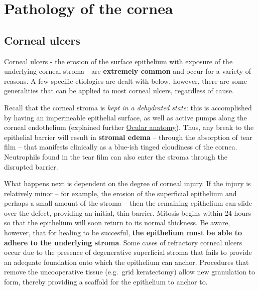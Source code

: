 \documentclass[
  openany]{article}
\begin{document}
\hypertarget{pathology-of-the-cornea}{%
\section{Pathology of the cornea}\label{pathology-of-the-cornea}}

\hypertarget{corneal-ulcers}{%
\subsection{Corneal ulcers}\label{corneal-ulcers}}

Corneal ulcers - the erosion of the surface epithelium with exposure of the underlying corneal stroma - are \textbf{extremely common} and occur for a variety of reasons. A few specific etiologies are dealt with below, however, there are some generalities that can be applied to most corneal ulcers, regardless of cause.

Recall that the corneal stroma is \emph{kept in a dehydrated state}: this is accomplished by having an impermeable epithelial surface, as well as active pumps along the corneal endothelium (explained further \protect\hyperlink{ocular-anatomy}{Ocular anatomy}). Thus, any break to the epithelial barrier will result in \textbf{stromal edema} -- through the absorption of tear film -- that manifests clinically as a blue-ish tinged cloudiness of the cornea. Neutrophils found in the tear film can also enter the stroma through the disrupted barrier.

What happens next is dependent on the degree of corneal injury. If the injury is relatively minor -- for example, the erosion of the superficial epithelium and perhaps a small amount of the stroma -- then the remaining epithelium can slide over the defect, providing an initial, thin barrier. Mitosis begins within 24 hours so that the epithelium will soon return to its normal thickness. Be aware, however, that for healing to be succesful, \textbf{the epithelium must be able to adhere to the underlying stroma}. Some cases of refractory corneal ulcers occur due to the presence of degenerative superficial stroma that fails to provide an adequate foundation onto which the epithelium can anchor. Procedures that remove the uncooperative tissue (e.g.~grid keratectomy) allow new granulation to form, thereby providing a scaffold for the epithelium to anchor to.
\end{document}
